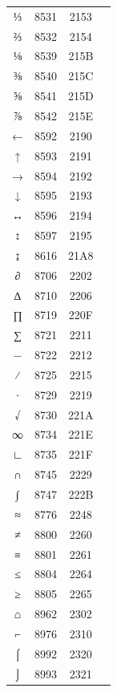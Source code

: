 ﻿\documentclass[10pt]{article}
\begin{document}
\begin{tabular}{crcl}
⅓&8531&2153&\\
⅔&8532&2154&\\
⅛&8539&215B&\\
⅜&8540&215C&\\
⅝&8541&215D&\\
⅞&8542&215E&\\
←&8592&2190&\\
↑&8593&2191&\\
→&8594&2192&\\
↓&8595&2193&\\
↔&8596&2194&\\
↕&8597&2195&\\
↨&8616&21A8&\\
∂&8706&2202&\\
∆&8710&2206&\\
∏&8719&220F&\\
∑&8721&2211&\\
−&8722&2212&\\
∕&8725&2215&\\
∙&8729&2219&\\
√&8730&221A&\\
∞&8734&221E&\\
∟&8735&221F&\\
∩&8745&2229&\\
∫&8747&222B&\\
≈&8776&2248&\\
≠&8800&2260&\\
≡&8801&2261&\\
≤&8804&2264&\\
≥&8805&2265&\\
⌂&8962&2302&\\
⌐&8976&2310&\\
⌠&8992&2320&\\
⌡&8993&2321&\\
\end{tabular}
\end{document}
